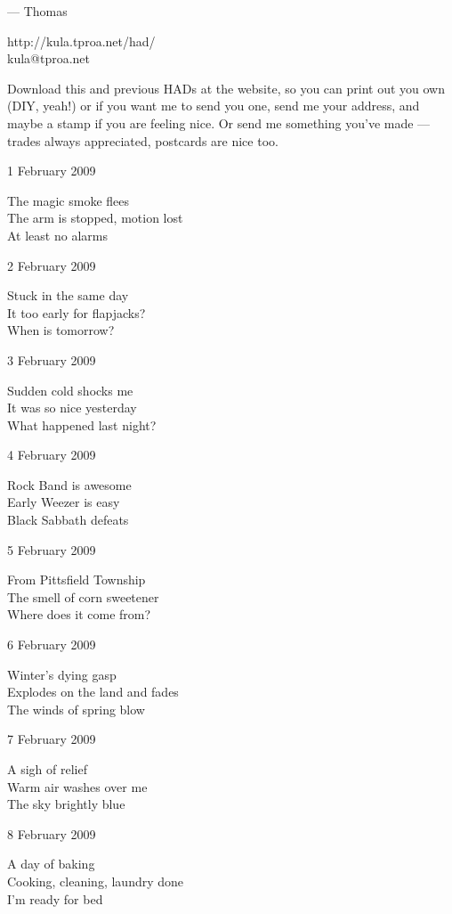 \documentclass[12pt]{article}
\begin{document}
--- Thomas

http://kula.tproa.net/had/ \\
kula@tproa.net

Download this and previous HADs at the website, so you can
print out you own (DIY, yeah!) or if you want me to send
you one, send me your address, and maybe a stamp if you
are feeling nice. Or send me something you've made ---
trades always appreciated, postcards are nice too.


\newpage

1 February 2009

The magic smoke flees \\
The arm is stopped, motion lost \\
At least no alarms

2 February 2009

Stuck in the same day \\
It too early for flapjacks? \\
When is tomorrow?

3 February 2009

Sudden cold shocks me \\
It was so nice yesterday \\
What happened last night?

4 February 2009

Rock Band is awesome \\
Early Weezer is easy \\
Black Sabbath defeats

5 February 2009

From Pittsfield Township \\
The smell of corn sweetener \\
Where does it come from?

6 February 2009

Winter's dying gasp \\
Explodes on the land and fades \\
The winds of spring blow

7 February 2009

A sigh of relief \\
Warm air washes over me \\
The sky brightly blue

\newpage

8 February 2009

A day of baking \\
Cooking, cleaning, laundry done \\
I'm ready for bed
\end{document}
